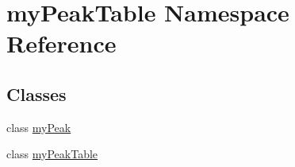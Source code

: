 \hypertarget{namespacemy_peak_table}{\section{my\-Peak\-Table Namespace Reference}
\label{namespacemy_peak_table}
}
\subsection*{Classes}
\begin{DoxyCompactItemize}
\item 
class \hyperlink{classmy_peak_table_1_1my_peak}{my\-Peak}
\item 
class \hyperlink{classmy_peak_table_1_1my_peak_table}{my\-Peak\-Table}
\end{DoxyCompactItemize}
